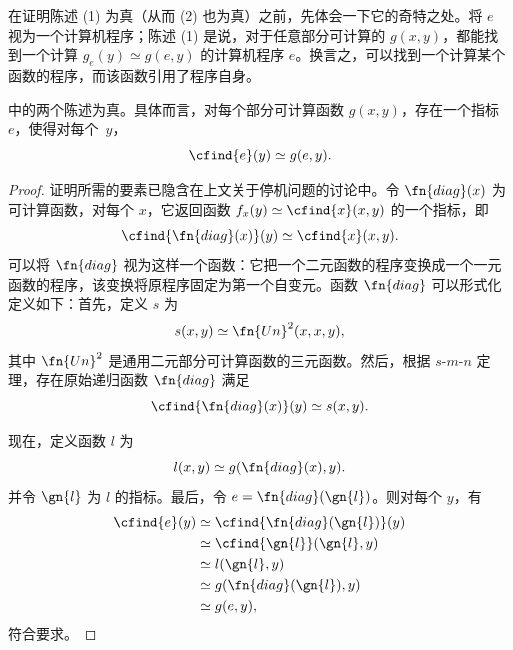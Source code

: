 \documentclass[../../../include/open-logic-section]{subfiles}
\begin{document}
\begin{explain}
在证明陈述 (1) 为真（从而 (2) 也为真）之前，先体会一下它的奇特之处。将 $e$ 视为一个计算机程序；陈述 (1) 是说，对于任意部分可计算的 $g(x,y)$，都能找到一个计算 $g_e(y) \simeq g(e,y)$ 的计算机程序 $e$。换言之，可以找到一个计算某个函数的程序，而该函数引用了程序自身。
\end{explain}

\begin{thm}
 中的两个陈述为真。具体而言，对每个部分可计算函数 $g(x,y)$，存在一个指标~$e$，使得对每个~$y$，
\[
\cfind{e}(y) \simeq g(e,y).
\]
\end{thm}

\begin{proof}
证明所需的要素已隐含在上文关于停机问题的讨论中。令 $\fn{diag}(x)$ 为可计算函数，对每个 $x$，它返回函数 $f_x(y) \simeq \cfind{x}(x,y)$ 的一个指标，即
\[
\cfind{\fn{diag}(x)}(y) \simeq \cfind{x}(x,y).
\]
可以将 $\fn{diag}$ 视为这样一个函数：它把一个二元函数的程序变换成一个一元函数的程序，该变换将原程序固定为第一个自变元。函数 $\fn{diag}$ 可以形式化定义如下：首先，定义 $s$ 为
\[
s(x,y) \simeq \fn{Un}^2(x,x,y),
\]
其中 $\fn{Un}^2$ 是通用二元部分可计算函数的三元函数。然后，根据 $s$-$m$-$n$ 定理，存在原始递归函数 $\fn{diag}$ 满足
\[
\cfind{\fn{diag}(x)}(y) \simeq s(x,y).
\]

现在，定义函数 $l$ 为
\[
l(x,y) \simeq g(\fn{diag}(x),y).
\]
并令 $\gn{l}$ 为 $l$ 的指标。最后，令 $e = \fn{diag}(\gn{l})$。则对每个 $y$，有
\begin{align*}
\cfind{e}(y) & \simeq \cfind{\fn{diag}(\gn{l})}(y) \\
& \simeq \cfind{\gn{l}}(\gn{l}, y) \\
& \simeq l(\gn{l}, y) \\
& \simeq g(\fn{diag}(\gn{l}),y) \\
& \simeq g(e, y),
\end{align*}
符合要求。
\end{proof}
\end{document}

